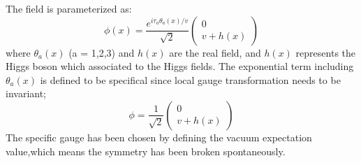 
The field is parameterized as:
\begin{equation}
\phi(x)=\frac{e^{i \tau_{a} \theta_{a}(x) / v}}{\sqrt{2}}\left(\begin{array}{c}
0 \\
v+h(x)
\end{array}\right)
\end{equation}
where $\theta_{a}(x)$ (a = 1,2,3) and $h(x)$ are the real field, and  $h(x)$ represents the Higgs boson which associated to the Higgs fields. The exponential term including $\theta_{a}(x)$ is defined to be specifical since local gauge transformation needs to be invariant;
\begin{equation}
\phi=\frac{1}{\sqrt{2}}\left(\begin{array}{c}
0 \\
v+h(x)
\end{array}\right)
\end{equation}
The specific gauge has been chosen by defining the vacuum expectation value,which means the symmetry has been broken spontaneously. 


